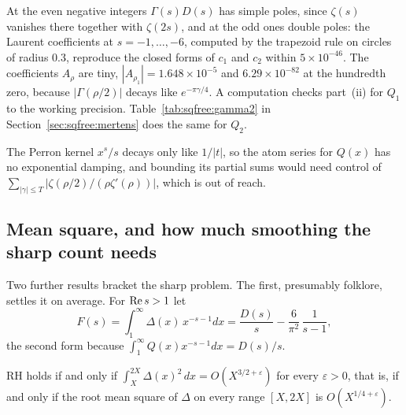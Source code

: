At the even negative integers $\Gamma(s)D(s)$ has simple poles, since $\zeta(s)$ vanishes there together with $\zeta(2s)$, and at the odd ones double poles: the Laurent coefficients at $s=-1,\dots,-6$, computed by the trapezoid rule on circles of radius $0.3$, reproduce the closed forms of $c_1$ and $c_2$ within $5\times10^{-46}$. 
The coefficients $A_\rho$ are tiny, $|A_{\rho_1}|=1.648\times10^{-5}$ and $6.29\times10^{-82}$ at the hundredth zero, because $|\Gamma(\rho/2)|$ decays like $e^{-\pi\gamma/4}$. A computation checks part~(ii) for $Q_1$ to the working precision. Table~\ref{tab:sqfree:gamma2} in Section~\ref{sec:sqfree:mertens} does the same for $Q_2$.

The Perron kernel $x^s/s$ decays only like $1/|t|$, so the atom series for $Q(x)$ has no exponential damping, and bounding its partial sums would need control of $\sum_{|\gamma|\le T}|\zeta(\rho/2)/(\rho\zeta'(\rho))|$, which is out of reach.

\subsection{Mean square, and how much smoothing the sharp count needs}\label{sec:sqfree:meansq}

Two further results bracket the sharp problem. The first, presumably folklore, settles it on average. For $\operatorname{Re} s>1$ let
\[
F(s)=\int_1^\infty\Delta(x)\,x^{-s-1}dx=\frac{D(s)}s-\frac6{\pi^2}\,\frac1{s-1},
\]
the second form because $\int_1^\infty Q(x)x^{-s-1}dx=D(s)/s$.

\begin{theorem}\label{thm:sqfree:meansq}
RH holds if and only if $\int_X^{2X}\Delta(x)^2\,dx=O(X^{3/2+\varepsilon})$ for every $\varepsilon>0$, that is, if and only if the root mean square of $\Delta$ on every range $[X,2X]$ is $O(X^{1/4+\varepsilon})$.
\end{theorem}

